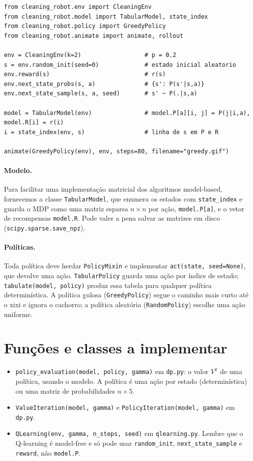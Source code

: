 \documentclass[11pt,a4paper]{article}
\newcommand{\code}[1]{\texttt{#1}}
\begin{document}
\begin{lstlisting}
from cleaning_robot.env import CleaningEnv
from cleaning_robot.model import TabularModel, state_index
from cleaning_robot.policy import GreedyPolicy
from cleaning_robot.animate import animate, rollout

env = CleaningEnv(k=2)                  # p = 0.2
s = env.random_init(seed=0)             # estado inicial aleatorio
env.reward(s)                           # r(s)
env.next_state_probs(s, a)              # {s': P(s'|s,a)}
env.next_state_sample(s, a, seed)       # s' ~ P(.|s,a)

model = TabularModel(env)               # model.P[a][i, j] = P(j|i,a), model.R[i] = r(i)
i = state_index(env, s)                 # linha de s em P e R

animate(GreedyPolicy(env), env, steps=80, filename="greedy.gif")
\end{lstlisting}

\paragraph{Modelo.} Para facilitar uma implementação matricial dos algoritmos model-based,
fornecemos a classe \code{TabularModel}, que enumera os estados com \code{state\_index} e guarda o
MDP como uma matriz esparsa $n \times n$ por ação, \code{model.P[a]}, e o vetor de recompensas
\code{model.R}. Pode valer a pena salvar as matrizes em disco (\code{scipy.sparse.save\_npz}).

\paragraph{Políticas.} Toda política deve herdar \code{PolicyMixin} e implementar
\code{act(state, seed=None)}, que devolve uma ação. \code{TabularPolicy} guarda uma ação por índice
de estado; \code{tabulate(model, policy)} produz essa tabela para qualquer política
determinística. A política gulosa (\code{GreedyPolicy}) segue o caminho mais curto até o xixi e
ignora o cachorro; a política aleatória (\code{RandomPolicy}) escolhe uma ação uniforme.

\section{Funções e classes a implementar}
\label{sec:fc}

\begin{itemize}
  \item \code{policy\_evaluation(model, policy, gamma)} em \code{dp.py}: o valor $V^\pi$ de uma
    política, usando o modelo. A política é uma ação por estado (determinística) ou uma matriz de
    probabilidades $n \times 5$.
  \item \code{ValueIteration(model, gamma)} e \code{PolicyIteration(model, gamma)} em
    \code{dp.py}.
  \item \code{QLearning(env, gamma, n\_steps, seed)} em \code{qlearning.py}. Lembre que o
    Q-learning é model-free e só pode usar \code{random\_init}, \code{next\_state\_sample} e
    \code{reward}, não \code{model.P}.
\end{itemize}
\end{document}
